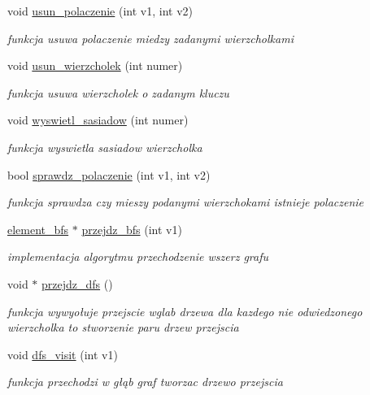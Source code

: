 \begin{DoxyCompactItemize}
void \hyperlink{classgraf_ac7e01e940f136f4020e4da816c2fb1b4}{usun\-\_\-polaczenie} (int v1, int v2)
\begin{DoxyCompactList}\small\item\em funkcja usuwa polaczenie miedzy zadanymi wierzcholkami \end{DoxyCompactList}\item 
void \hyperlink{classgraf_a369202eb63332e9faad779591c862ece}{usun\-\_\-wierzcholek} (int numer)
\begin{DoxyCompactList}\small\item\em funkcja usuwa wierzcholek o zadanym kluczu \end{DoxyCompactList}\item 
void \hyperlink{classgraf_a8dd83fa1722d917a143b2da9245b5db9}{wyswietl\-\_\-sasiadow} (int numer)
\begin{DoxyCompactList}\small\item\em funkcja wyswietla sasiadow wierzcholka \end{DoxyCompactList}\item 
bool \hyperlink{classgraf_ae1ebd85c7cb288174a5dccc5fd90634e}{sprawdz\-\_\-polaczenie} (int v1, int v2)
\begin{DoxyCompactList}\small\item\em funkcja sprawdza czy mieszy podanymi wierzchokami istnieje polaczenie \end{DoxyCompactList}\item 
\hyperlink{structelement__bfs}{element\-\_\-bfs} $\ast$ \hyperlink{classgraf_a5b67e5e829440e984782b232188a5f57}{przejdz\-\_\-bfs} (int v1)
\begin{DoxyCompactList}\small\item\em implementacja algorytmu przechodzenie wszerz grafu \end{DoxyCompactList}\item 
void $\ast$ \hyperlink{classgraf_a4947702a6d93feb805b1e11e14ec1e13}{przejdz\-\_\-dfs} ()
\begin{DoxyCompactList}\small\item\em funkcja wywyołuje przejscie wglab drzewa dla kazdego nie odwiedzonego wierzcholka  to stworzenie paru drzew przejscia \end{DoxyCompactList}\item 
void \hyperlink{classgraf_a84527840c48cc131f9ef2ca493550ea0}{dfs\-\_\-visit} (int v1)
\begin{DoxyCompactList}\small\item\em funkcja przechodzi w głąb graf tworzac drzewo przejscia \end{DoxyCompactList}\end{DoxyCompactItemize}
